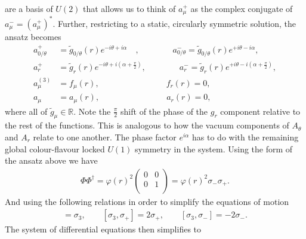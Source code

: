     are a basis of $U(2)$ that allows us to think of $a_{\mu}^{+}$ as the complex conjugate of $a_{\mu}^{-}= (a_{\mu}^{+})^*$. Further, restricting to a static, circularly symmetric solution, the ansatz becomes
\begin{align}
    a_{0/\theta}^{+} &= \tilde{g}_{0/\theta}(r)e^{-i \theta + i\alpha}\quad, \qquad \qquad a_{0/\theta}^{-} = \tilde{g}_{0/\theta}(r)e^{+i \theta - i\alpha}, \label{eq:U2_gauge_ansatz_static_1}\\
    a_{r}^{+} &= \tilde{g}_{r}(r)e^{-i \theta + i\left(\alpha + \frac{\pi}{2} \right)}, \qquad \qquad a_{r}^{-} = \tilde{g}_{r}(r)e^{+i \theta - i\left(\alpha + \frac{\pi}{2} \right)}, \label{eq:U2_gauge_ansatz_static_2}\\
    a_{\mu}^{(3)}&= f_{\mu}(r),\qquad \qquad \qquad \qquad f_r(r)=0, \label{eq:U2_gauge_ansatz_static_3}\\
    a_{\mu}&= a_{\mu}(r),\qquad \qquad \qquad \qquad a_r(r)=0\label{eq:U2_gauge_ansatz_static_4},
\end{align}
where all of $\tilde{g}_{\mu} \in \mathbb{R}$. Note the $\frac{\pi}{2}$ shift of the phase of the $g_r$ component relative to the rest of the functions. This is analogous to how the vacuum components of $A_{\theta}$ and $A_r$ relate to one another. The phase factor $e^{i \alpha}$ has to do with the remaining global colour-flavour locked $U(1)$ symmetry in the system. Using the form of the ansatz above we have
    \begin{align}
        \Phi \Phi^{\dag} = \varphi(r)^2 \begin{pmatrix} 
            0 & 0\\
            0 & 1\\
        \end{pmatrix} = \varphi(r)^2 \sigma_- \sigma_+.
    \end{align}
    And using the following relations in order to simplify the equations of motion
    \begin{align}
        [\sigma_+, \sigma_-] = \sigma_3, \qquad [\sigma_3, \sigma_+] = 2 \sigma_+, \qquad [\sigma_3, \sigma_-] = -2 \sigma_-.
    \end{align}
    The system of differential equations then simplifies to
